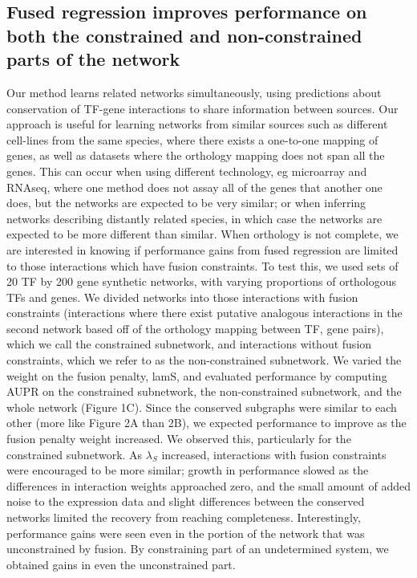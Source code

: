 \documentclass[11pt]{article}
\begin{document}
\subsection{Fused regression improves performance on both the constrained and non-constrained parts of the network}
Our method learns related networks simultaneously, using predictions about conservation of TF-gene interactions to share information between sources. Our approach is useful for learning networks from similar sources such as different cell-lines from the same species, where there exists a one-to-one mapping of genes, as well as datasets where the orthology mapping does not span all the genes. This can occur when using different technology, eg microarray and RNAseq, where one method does not assay all of the genes that another one does, but the networks are expected to be very similar; or when inferring networks describing distantly related species, in which case the networks are expected to be more different than similar. When orthology is not complete, we are interested in knowing if performance gains from fused regression are limited to those interactions which have fusion constraints. To test this, we used sets of 20 TF by 200 gene synthetic networks, with varying proportions of orthologous TFs and genes. We divided networks into those interactions with fusion constraints (interactions where there exist putative analogous interactions in the second network based off of the orthology mapping between TF, gene pairs), which we call the constrained subnetwork, and interactions without fusion constraints, which we refer to as the non-constrained subnetwork. We varied the weight on the fusion penalty, lamS, and evaluated performance by computing AUPR on the constrained subnetwork, the non-constrained subnetwork, and the whole network (Figure 1C). Since the conserved subgraphs were similar to each other (more like Figure 2A than 2B), we expected performance to improve as the fusion penalty weight increased. We observed this, particularly for the constrained subnetwork. As $\lambda_S$ increased, interactions with fusion constraints were encouraged to be more similar; growth in performance slowed as the differences in interaction weights approached zero, and the small amount of added noise to the expression data and slight differences between the conserved networks limited the recovery from reaching completeness. Interestingly, performance gains were seen even in the portion of the network that was unconstrained by fusion. By constraining part of an undetermined system, we obtained gains in even the unconstrained part. 
\end{document}
